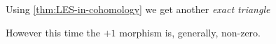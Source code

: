 \documentclass[../../../main]{subfiles}
\begin{document}
Using \autoref{thm:LES-in-cohomology} we get another \textit{exact triangle}
\begin{center}
\end{center}
However this time the \(+1\) morphism is, generally, non-zero.
\end{document}
